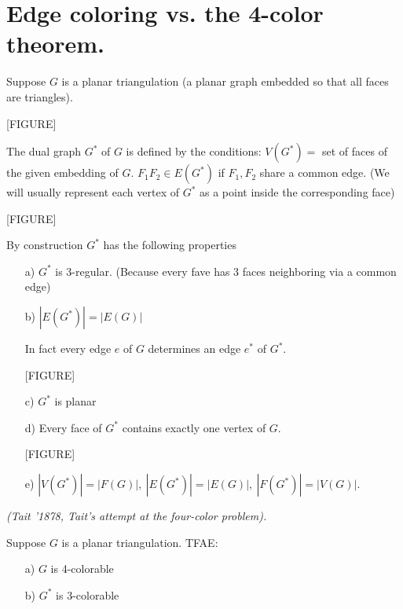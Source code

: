 \section{Edge coloring vs. the 4-color theorem.}

Suppose $G$ is a planar triangulation (a planar graph embedded so that all faces are triangles). 

[FIGURE]

\begin{definition}
The dual graph $G^*$ of $G$ is defined by the conditions: $V(G^*)=$ set of faces of the given embedding of $G$. $F_1F_2\in E(G^*)$ if $F_1,F_2$ share a common edge. (We will usually represent each vertex of $G^*$ as a point inside the corresponding face)

[FIGURE]

\end{definition}

\begin{observation}
By construction $G^*$ has the following properties
\begin{enumerate}
    \item[a)] $G^*$ is 3-regular. (Because every fave has 3 faces neighboring via a common edge)
    \item[b)] $|E(G^*)|=|E(G)|$
    
            In fact every edge $e$ of $G$ determines an edge $e^*$ of $G^*$. 
            
[FIGURE]            
    \item[c)] $G^*$ is planar
    \item[d)] Every face of $G^*$ contains exactly one vertex of $G$.

[FIGURE]

    \item[e)]   $|V(G^*)|=|F(G)|,\ |E(G^*)|=|E(G)|,\ |F(G^*)|=|V(G)|.$
\end{enumerate}
\end{observation}

\begin{theorem}
\emph{(Tait '1878, Tait's attempt at the four-color problem).}

Suppose $G$ is a planar triangulation. TFAE:
\begin{enumerate}
    \item[a)] $G$ is 4-colorable
    \item[b)] $G^*$ is 3-colorable
\end{enumerate}
\end{theorem}

